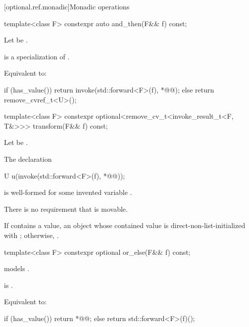 [optional.ref.monadic]{Monadic operations}

\begin{itemdecl}
template<class F> constexpr auto and_then(F&& f) const;
\end{itemdecl}

\begin{itemdescr}
\pnum
Let  be .

\pnum
\mandates
{} is a specialization of .

\pnum
\effects
  Equivalent to:
\begin{codeblock}
if (has_value()) {
  return invoke(std::forward<F>(f), *@@);
} else {
  return remove_cvref_t<U>();
}
\end{codeblock}
\end{itemdescr}

\begin{itemdecl}
template<class F>
  constexpr optional<remove_cv_t<invoke_result_t<F, T&>>> transform(F&& f) const;
\end{itemdecl}

\begin{itemdescr}
\pnum
  Let  be .

\pnum
\mandates
The declaration
\begin{codeblock}
U u(invoke(std::forward<F>(f), *@@));
\end{codeblock}
is well-formed for some invented variable .
\begin{note}
There is no requirement that  is movable.
\end{note}

\pnum
\returns
If  contains a value, an  object
whose contained value is direct-non-list-initialized with
;
otherwise, .
\end{itemdescr}

\begin{itemdecl}
template<class F> constexpr optional or_else(F&& f) const;
\end{itemdecl}

\begin{itemdescr}
\pnum
\constraints
{} models .

\pnum
\mandates
{} is .

\pnum
\effects
Equivalent to:
\begin{codeblock}
if (has_value()) {
  return *@@;
} else {
  return std::forward<F>(f)();
}
\end{codeblock}
\end{itemdescr}

